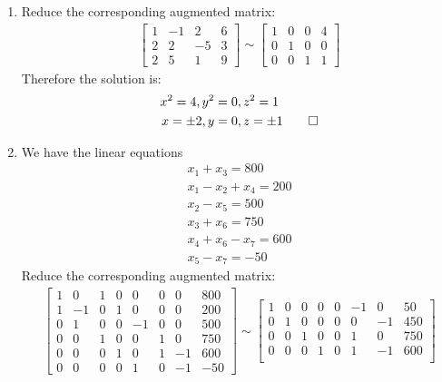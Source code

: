 \documentclass[12pt, a4paper]{article}
\begin{document}
\begin{enumerate}[Q\arabic*.]
  \item Reduce the corresponding augmented matrix:
    \begin{align*}
      \begin{bmatrix}
        1 & -1 & 2 & 6 \\
        2 & 2 & -5 & 3 \\
        2 & 5 & 1 & 9
      \end{bmatrix} \sim
      \begin{bmatrix}
        1 & 0 & 0 & 4 \\
        0 & 1 & 0 & 0 \\
        0 & 0 & 1 & 1
      \end{bmatrix}
    \end{align*}
    Therefore the solution is:
    \begin{align*}
      x^2 = 4, y^2 &= 0, z^2 = 1 \\
      x = \pm2, y &= 0, z = \pm1 \qed
    \end{align*}
  \item We have the linear equations
    \begin{align*}
      x_1 + x_3 = 800 \\
      x_1 - x_2 + x_4 = 200 \\
      x_2 - x_5 = 500 \\
      x_3 + x_6 = 750 \\
      x_4 + x_6 - x_7 = 600 \\
      x_5 - x_7 = -50
    \end{align*}
    Reduce the corresponding augmented matrix:
    \begin{align*}
      \begin{bmatrix}
        1 & 0 & 1 & 0 & 0 & 0 & 0 & 800 \\
        1 & -1 & 0 & 1 & 0 & 0 & 0 & 200 \\
        0 & 1 & 0 & 0 & -1 & 0 & 0 & 500 \\
        0 & 0 & 1 & 0 & 0 & 1 & 0 & 750 \\
        0 & 0 & 0 & 1 & 0 & 1 & -1 & 600 \\
        0 & 0 & 0 & 0 & 1 & 0 & -1 & -50
      \end{bmatrix} \sim
      \begin{bmatrix}
        1 & 0 & 0 & 0 & 0 & -1 & 0 & 50 \\
        0 & 1 & 0 & 0 & 0 & 0 & -1 & 450 \\
        0 & 0 & 1 & 0 & 0 & 1 & 0 & 750 \\
        0 & 0 & 0 & 1 & 0 & 1 & -1 & 600 \\

\end{bmatrix}
\end{align*}
\end{enumerate}
\end{document}
